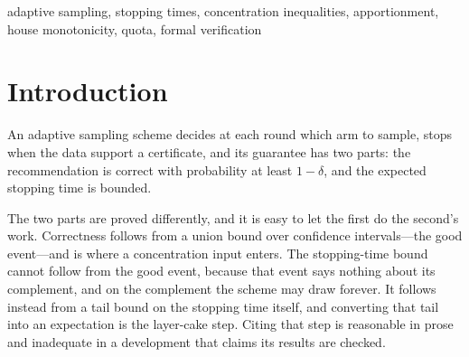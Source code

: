\begin{abstract}
horizon eleven. An exhaustive search over $1{,}228{,}079$ rational targets finds
$375{,}239$ that violate the bound, the worst reaching $\tfrac74$ and the earliest at $t=3$.
Seven online rules are then compared, four of them classical apportionment divisor methods,
and the comparison corrects a claim this paper previously made: Jefferson's rule violates the
deficit bound on none of the targets, so the failure is not common to every rule. An eighth
rule settles the stronger question: Balinski and Young's quota method, which is
house-monotone and within quota by construction, violates neither bound on any of the
$32{,}018$ targets, so the obstruction is not integrality but this rule. Two further
measurements locate the constant. Lifting the denominator limit that the census had been
pinned against raises the worst deficit at eight arms from $\tfrac74$ to $\tfrac{307}{160}$,
and the worst over twenty arms is $\tfrac{321}{160}$---a plateau at about two, far below the
$K-1$ the literature proves, so a bound linear in the arm count is the wrong shape for what
this rule does.
\end{abstract}

\begin{IEEEkeywords}
adaptive sampling, stopping times, concentration inequalities, apportionment,
house monotonicity, quota, formal verification
\end{IEEEkeywords}

\section{Introduction}

An adaptive sampling scheme decides at each round which arm to sample, stops when the data
support a certificate, and its guarantee has two parts: the recommendation is correct with
probability at least $1-\delta$, and the expected stopping time is bounded.

The two parts are proved differently, and it is easy to let the first do the second's work.
Correctness follows from a union bound over confidence intervals---the good event---and is
where a concentration input enters. The stopping-time bound cannot follow from the good event,
because that event says nothing about its complement, and on the complement the scheme may
draw forever. It follows instead from a tail bound on the stopping time itself, and converting
that tail into an expectation is the layer-cake step. Citing that step is reasonable in prose
and inadequate in a development that claims its results are checked.

